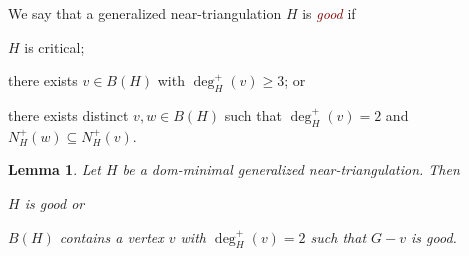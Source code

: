 \documentclass[12pt]{article}
\newtheorem{lem}{Lemma}
\newcommand{\defin}[1]{\emph{\textcolor{Maroon}{#1}}}
\begin{document}
We say that a generalized near-triangulation $H$ is \defin{good} if 
\begin{compactenum}[(G1)]
      \item $H$ is critical;
      \item there exists $v\in B(H)$ with $\deg^+_H(v)\ge 3$; or
      \item there exists distinct $v,w\in B(H)$ such that $\deg^+_H(v)=2$ and $N^+_H(w)\subseteq N^+_H(v)$.
\end{compactenum}

\begin{lem}\label{not_good}
  Let $H$ be a dom-minimal generalized near-triangulation.  Then \begin{compactenum}[(i)]
    \item $H$ is good or 
    \item $B(H)$ contains a vertex $v$ with $\deg^+_H(v)=2$ such that $G-v$ is good.
  \end{compactenum}
\end{lem}
\end{document}
